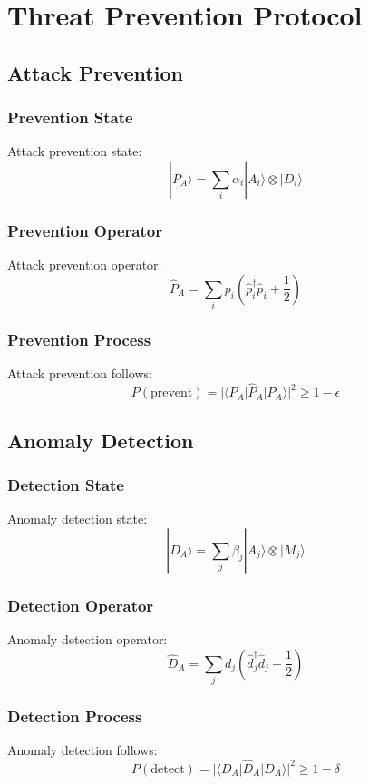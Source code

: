 \documentclass[12pt]{article}
\begin{document}
\section{Threat Prevention Protocol}
\subsection{Attack Prevention}
\subsubsection{Prevention State}
Attack prevention state:
\begin{equation}
|P_A\rangle = \sum_i \alpha_i|A_i\rangle \otimes |D_i\rangle
\end{equation}
\subsubsection{Prevention Operator}
Attack prevention operator:
\begin{equation}
\hat{P}_A = \sum_i p_i(\hat{p}_i^\dagger\hat{p}_i + \frac{1}{2})
\end{equation}
\subsubsection{Prevention Process}
Attack prevention follows:
\begin{equation}
P(\text{prevent}) = |\langle P_A|\hat{P}_A|P_A\rangle|^2 \geq 1 - \epsilon
\end{equation}
\subsection{Anomaly Detection}
\subsubsection{Detection State}
Anomaly detection state:
\begin{equation}
|D_A\rangle = \sum_j \beta_j|A_j\rangle \otimes |M_j\rangle
\end{equation}
\subsubsection{Detection Operator}
Anomaly detection operator:
\begin{equation}
\hat{D}_A = \sum_j d_j(\hat{d}_j^\dagger\hat{d}_j + \frac{1}{2})
\end{equation}
\subsubsection{Detection Process}
Anomaly detection follows:
\begin{equation}
P(\text{detect}) = |\langle D_A|\hat{D}_A|D_A\rangle|^2 \geq 1 - \delta
\end{equation}
\end{document}
